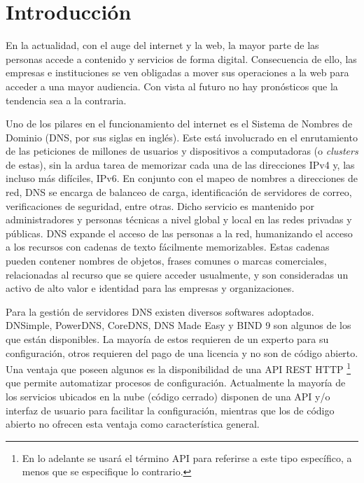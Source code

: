\chapter{Introducción}\label{chapter:introduction}

En la actualidad, con el auge del internet y la web, la mayor parte de las personas accede a contenido y servicios de forma digital. Consecuencia de ello, las empresas e instituciones se ven obligadas a mover sus operaciones a la web para acceder a una mayor audiencia. Con vista al futuro no hay pronósticos que la tendencia sea a la contraria.

Uno de los pilares en el funcionamiento del internet es el Sistema de Nombres de Dominio (DNS, por sus siglas en inglés). Este está involucrado en el enrutamiento de las peticiones de millones de usuarios y dispositivos a computadoras (o \textit{clusters} de estas), sin la ardua tarea de memorizar cada una de las direcciones IPv4 y, las incluso más difíciles, IPv6. En conjunto con el mapeo de nombres a direcciones de red, DNS se encarga de balanceo de carga, identificación de servidores de correo, verificaciones de seguridad, entre otras. Dicho servicio es mantenido por administradores y personas técnicas a nivel global y local en las redes privadas y públicas. DNS expande el acceso de las personas a la red, humanizando el acceso a los recursos con cadenas de texto fácilmente memorizables. Estas cadenas pueden contener nombres de objetos, frases comunes o marcas comerciales, relacionadas al recurso que se quiere acceder usualmente, y son consideradas un activo de alto valor e identidad para las empresas y organizaciones.

Para la gestión de servidores DNS existen diversos softwares adoptados. DNSimple, PowerDNS, CoreDNS, DNS Made Easy y BIND 9 son algunos de los que están disponibles. La mayoría de estos requieren de un experto para su configuración, otros requieren del pago de una licencia y no son de código abierto. Una ventaja que poseen algunos es la disponibilidad de una API REST HTTP \footnote{En lo adelante se usará el término API para referirse a este tipo específico, a menos que se especifique lo contrario.} que permite automatizar procesos de configuración. Actualmente la mayoría de los servicios ubicados en la nube (código cerrado) disponen de una API y/o interfaz de usuario para facilitar la configuración, mientras que los de código abierto no ofrecen esta ventaja como característica general.

